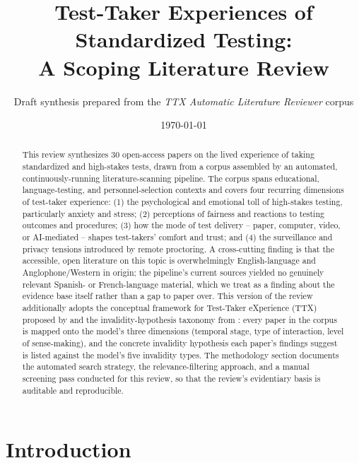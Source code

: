 \documentclass[11pt]{article}
\title{Test-Taker Experiences of Standardized Testing:\\ A Scoping Literature Review}
\author{Draft synthesis prepared from the \emph{TTX Automatic Literature Reviewer} corpus}
\date{\today}
\begin{document}
\maketitle

\begin{abstract}
\noindent This review synthesizes 30 open-access papers on the lived experience of taking standardized and high-stakes tests, drawn from a corpus assembled by an automated, continuously-running literature-scanning pipeline. The corpus spans educational, language-testing, and personnel-selection contexts and covers four recurring dimensions of test-taker experience: (1) the psychological and emotional toll of high-stakes testing, particularly anxiety and stress; (2) perceptions of fairness and reactions to testing outcomes and procedures; (3) how the mode of test delivery -- paper, computer, video, or AI-mediated -- shapes test-takers' comfort and trust; and (4) the surveillance and privacy tensions introduced by remote proctoring. A cross-cutting finding is that the accessible, open literature on this topic is overwhelmingly English-language and Anglophone/Western in origin; the pipeline's current sources yielded no genuinely relevant Spanish- or French-language material, which we treat as a finding about the evidence base itself rather than a gap to paper over. This version of the review additionally adopts the conceptual framework for Test-Taker eXperience (TTX) proposed by \citet{araneda2025ttxmodel} and the invalidity-hypothesis taxonomy from \citet{araneda2023dissertation}: every paper in the corpus is mapped onto the model's three dimensions (temporal stage, type of interaction, level of sense-making), and the concrete invalidity hypothesis each paper's findings suggest is listed against the model's five invalidity types. The methodology section documents the automated search strategy, the relevance-filtering approach, and a manual screening pass conducted for this review, so that the review's evidentiary basis is auditable and reproducible.
\end{abstract}

\section{Introduction}
\end{document}
